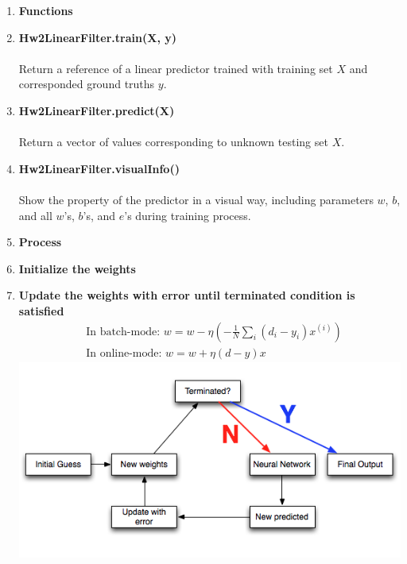 \documentclass[12pt]{article}
\makeatletter
\renewenvironment{itemize}
{\list{$\bullet$}{\leftmargin\z@ \labelwidth\z@ \itemindent-\leftmargin
\let\makelabel\descriptionlabel}}
{\endlist}
\makeatother
\begin{document}
\begin{enumerate}
	\item {\bf Functions}
	\begin{itemize}
		\item {\bf Hw2LinearFilter.train(X, y)} \\ \\
			Return a reference of a linear predictor trained with training set $X$ and corresponded ground truths $y$. \\
		\item {\bf Hw2LinearFilter.predict(X)} \\ \\
			Return a vector of values corresponding to unknown testing set $X$. \\
		\item {\bf Hw2LinearFilter.visualInfo()} \\ \\
			Show the property of the predictor in a visual way, including parameters $w$, $b$, and all $w$'s, $b$'s, and $e$'s during training process.
	\end{itemize}
	
	\newpage
	\item {\bf Process}
	\begin{itemize}
		\item {\bf Initialize the weights}
		\item {\bf Update the weights with error until terminated condition is satisfied}
			\begin{align*}
				&\text{In batch-mode:  }
				w = w - \eta (-\frac{1}{N}\displaystyle\sum_i (d_i - y_i) x^{(i)}) \\
				&\text{In online-mode:  }
				w = w + \eta (d-y) x
			\end{align*}
		\hspace*{-1em}
		\includegraphics[scale=.8]{../res/training_algorithm.png}
	\end{itemize}
\end{enumerate}
\end{document}
